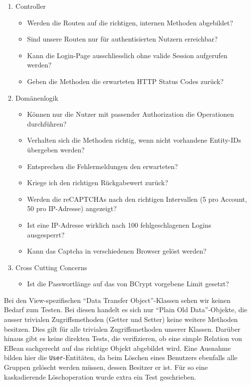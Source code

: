 \documentclass[12pt,DIV14,BCOR10mm,a4paper,twoside,parskip=half-,headsepline,headinclude,english,ngerman,bibliography=totocnumbered]{scrreprt}
\begin{document}
\begin{enumerate}
  \item Controller
  \begin{itemize}
    \item Werden die Routen auf die richtigen, internen Methoden abgebildet?
    \item Sind unsere Routen nur für authentisierten Nutzern erreichbar?
    \item Kann die Login-Page ausschliesslich ohne valide Session aufgerufen werden?
    \item Geben die Methoden die erwarteten HTTP Status Codes zurück?
  \end{itemize}

  \item Domänenlogik
  \begin{itemize}
    \item Können nur die Nutzer mit passender Authorization die Operationen durchführen?
    \item Verhalten sich die Methoden richtig, wenn nicht vorhandene Entity-IDs übergeben werden?
    \item Entsprechen die Fehlermeldungen den erwarteten?
    \item Kriege ich den richtigen Rückgabewert zurück?
    \item Werden die reCAPTCHAs nach den richtigen Intervallen (5 pro Account, 50 pro IP-Adresse) angezeigt?
    \item Ist eine IP-Adresse wirklich nach 100 fehlgeschlagenen Logins ausgesperrt?
    \item Kann das Captcha in verschiedenen Browser gelöst werden?
  \end{itemize}

  \item Cross Cutting Concerns
  \begin{itemize}
    \item Ist die Passwortlänge auf das von BCrypt vorgebene Limit gesetzt?
  \end{itemize}
\end{enumerate}

Bei den View-spezifischen \enquote{Data Transfer Object}-Klassen sehen wir keinen Bedarf zum Testen.
Bei diesen handelt es sich nur \enquote{Plain Old Data}-Objekte, die ausser trivialen Zugriffsmethoden (Getter und Setter) keine weitere Methoden besitzen.
Dies gilt für alle trivialen Zugriffsmethoden unserer Klassen.
Darüber hinaus gibt es keine direkten Tests, die verifizieren, ob eine simple Relation von EBean sachgerecht auf das richtige Objekt abgebildet wird.
Eine Ausnahme bilden hier die \texttt{User}-Entitäten, da beim Löschen eines Benutzers ebenfalls alle Gruppen gelöscht werden müssen, dessen Besitzer er ist. Für so eine kaskadierende Löschoperation wurde extra ein Test geschrieben.
\end{document}
